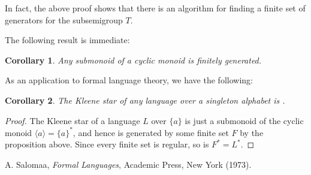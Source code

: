 \documentclass[12pt]{article}
\newtheorem{cor}{Corollary}
\begin{document}
In fact, the above proof shows that there is an algorithm for finding a finite set of generators for the subsemigroup $T$.

The following result is immediate:
\begin{cor} Any submonoid of a cyclic monoid is finitely generated.  \end{cor}

As an application to formal language theory, we have the following:
\begin{cor} The Kleene star of any language over a singleton alphabet is .  \end{cor}
\begin{proof}  The Kleene star of a language $L$ over $\lbrace a\rbrace$ is just a submonoid of the cyclic monoid $\langle a \rangle = \lbrace a \rbrace ^*$, and hence is generated by some finite set $F$ by the proposition above.  Since every finite set is regular, so is $F^* = L^*$.
\end{proof}

\begin{thebibliography}{9}
 A. Salomaa, {\em Formal Languages}, Academic Press, New York (1973).
\end{thebibliography}
\end{document}
